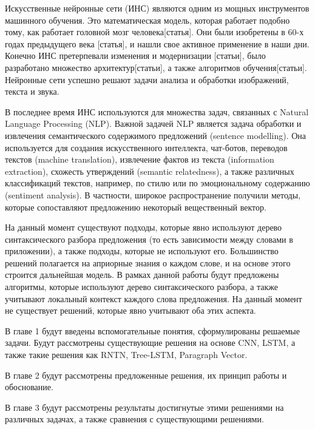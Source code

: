 \startprefacepage

Искусственные нейронные сети (ИНС) являются одним из мощных инструментов машинного
обучения.
Это математическая модель, которая работает подобно тому, как работает головной
мозг человека[статья].
Они были изобретены в 60-х годах предыдущего века [статья], и нашли свое активное
применение в наши дни. Конечно ИНС претерпевали изменения и модернизации
[статьи], было разработано множество архитектур[статьи], а также алгоритмов обучения[статьи].
Нейронные сети успешно решают задачи анализа и обработки изображений, текста и
звука.

В последнее время ИНС используются для множества задач, связанных с Natural
Language Processing (NLP). Важной задачей NLP является задача 
обработки и извлечения семантического содержимого предложений (sentence modelling).
Она используется для создания искусственного интеллекта, чат-ботов,
переводов текстов (machine translation), извлечение фактов из текста (information
extraction), схожесть утверждений (semantic relatedness), 
а также различных классификаций текстов, например,
по стилю или по эмоциональному содержанию (sentiment analysis).
В частности, широкое распространение получили методы, которые сопоставляют предложению некоторый вещественный вектор.

На данный момент существуют подходы, которые явно используют дерево синтаксического разбора предложения (то есть зависимости между словами в приложении), а также подходы, которые не используют его. Большинство решений полагается на априорные знания о каждом слове, и на основе этого строится дальнейшая модель.
В рамках данной работы будут предложены алгоритмы, которые используют дерево синтаксического разбора, а также учитывают локальный контекст каждого слова предложения. На данный момент не существует решений, которые явно учитывают оба этих аспекта.

В главе 1 будут введены вспомогательные понятия, сформулированы решаемые задачи.
Будут рассмотрены существующие решения на основе CNN, 
LSTM, а также такие решения как RNTN, Tree-LSTM, Paragraph Vector.

В главе 2 будут рассмотрены предложенные решения, их принцип работы и обоснование.

В главе 3 будут рассмотрены результаты достигнутые этими решениями на различных задачах, а также сравнения с существующими решениями.